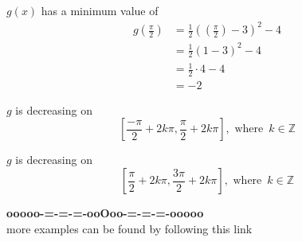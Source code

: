 \documentclass{ximera}
\begin{document}
$g(x)$ has a minimum value of
\begin{align*}
g\left( \frac{\pi}{2} \right) &= \frac{1}{2} \left(\left( \frac{\pi}{2} \right) - 3 \right)^2 - 4 \\
                               &= \frac{1}{2} (1 - 3)^2 - 4 \\
                               &= \frac{1}{2} \cdot 4 - 4 \\
                               &=  -2
\end{align*}



$g$ is decreasing on 
\[
\left[ \frac{-\pi}{2} + 2k\pi, \frac{\pi}{2} + 2k\pi \right], \text{ where } \,  k \in \mathbb{Z}
\]




$g$ is decreasing on 
\[
\left[ \frac{\pi}{2} + 2k\pi, \frac{3\pi}{2} + 2k\pi \right], \text{ where } \,  k \in \mathbb{Z}
\]






\begin{center}
\textbf{\textcolor{green!50!black}{ooooo-=-=-=-ooOoo-=-=-=-ooooo}} \\

more examples can be found by following this link\\ 

\end{center}
\end{document}
